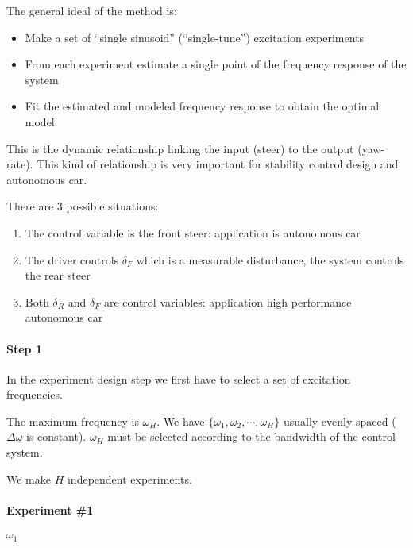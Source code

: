 
The general ideal of the method is:
\begin{itemize}
    \item Make a set of ``single sinusoid'' (``single-tune'') excitation experiments
    \item From each experiment estimate a single point of the frequency response of the system
    \item Fit the estimated and modeled frequency response to obtain the optimal model
\end{itemize}

\begin{example}

    This is the dynamic relationship linking the input (steer) to the output (yaw-rate).
    This kind of relationship is very important for stability control design and autonomous car.

    There are 3 possible situations:

    \begin{enumerate}
        \item The control variable is the front steer: application is autonomous car
        \item The driver controls $\delta_F$ which is a measurable disturbance, the system controls the rear steer
        \item Both $\delta_R$ and $\delta_F$ are control variables: application high performance autonomous car
    \end{enumerate}
\end{example}

\paragraph{Step 1} In the experiment design step we first have to select a set of excitation frequencies.


The maximum frequency is $\omega_H$.
We have $\{\omega_1, \omega_2, \cdots, \omega_H\}$ usually evenly spaced ($\Delta \omega$ is constant).
$\omega_H$ must be selected according to the bandwidth of the control system.

We make $H$ independent experiments.

\paragraph{Experiment \#1} $\omega_1$

